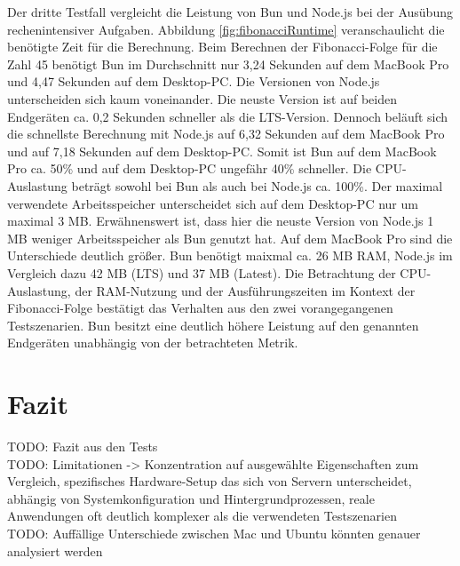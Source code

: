 \noindent
Der dritte Testfall vergleicht die Leistung von Bun und Node.js bei der Ausübung rechenintensiver Aufgaben. Abbildung \ref{fig:fibonacciRuntime} veranschaulicht die benötigte Zeit für die Berechnung. Beim Berechnen der Fibonacci-Folge für die Zahl 45 benötigt Bun im Durchschnitt nur 3,24 Sekunden auf dem MacBook Pro und 4,47 Sekunden auf dem Desktop-PC. Die Versionen von Node.js unterscheiden sich kaum voneinander. Die neuste Version ist auf beiden Endgeräten ca. 0,2 Sekunden schneller als die LTS-Version. Dennoch beläuft sich die schnellste Berechnung mit Node.js auf 6,32 Sekunden auf dem MacBook Pro und auf 7,18 Sekunden auf dem Desktop-PC. Somit ist Bun auf dem MacBook Pro ca. 50\% und auf dem Desktop-PC ungefähr 40\% schneller. Die CPU-Auslastung beträgt sowohl bei Bun als auch bei Node.js ca. 100\%. Der maximal verwendete Arbeitsspeicher unterscheidet sich auf dem Desktop-PC nur um maximal 3 MB. Erwähnenswert ist, dass hier die neuste Version von Node.js 1 MB weniger Arbeitsspeicher als Bun genutzt hat. Auf dem MacBook Pro sind die Unterschiede deutlich größer. Bun benötigt maixmal ca. 26 MB RAM, Node.js im Vergleich dazu 42 MB (LTS) und 37 MB (Latest).\newline
Die Betrachtung der CPU-Auslastung, der RAM-Nutzung und der Ausführungszeiten im Kontext der Fibonacci-Folge bestätigt das Verhalten aus den zwei vorangegangenen Testszenarien. Bun besitzt eine deutlich höhere Leistung auf den genannten Endgeräten unabhängig von der betrachteten Metrik.

\section{Fazit} \label{sec:performance-conclusion}
TODO: Fazit aus den Tests \\

TODO: Limitationen -> Konzentration auf ausgewählte Eigenschaften zum Vergleich, spezifisches Hardware-Setup das sich von Servern unterscheidet, abhängig von Systemkonfiguration und Hintergrundprozessen, reale Anwendungen oft deutlich komplexer als die verwendeten Testszenarien\\

TODO: Auffällige Unterschiede zwischen  Mac und Ubuntu könnten genauer analysiert werden\\